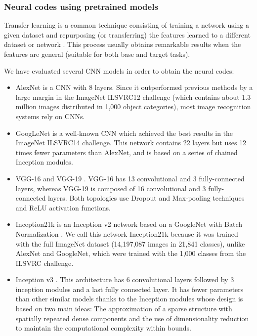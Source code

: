 \documentclass[final, twocolumn]{elsarticle}
\begin{document}
\subsubsection{Neural codes using pretrained models}
\label{sec:ncpm}

Transfer learning is a common technique consisting of training a network using a given dataset and repurposing (or transferring) the features learned to a different dataset or network \cite{Yosinski2014How}. This process usually obtains remarkable results when the features are general (suitable for both base and target tasks).

We have evaluated several CNN models in order to obtain the neural codes: 

\begin{itemize}
\item AlexNet \cite{Krizhevsky2012ImageNetNetworks} is a CNN with 8 layers. Since it outperformed previous methods by a large margin in the ImageNet ILSVRC12 \citep{Russakovsky2014ImageNetChallenge} challenge (which contains about 1.3 million images distributed in 1,000 object categories), most image recognition systems rely on CNNs. 

\item GoogLeNet \cite{Szegedy2014GoingConvolutions} is a well-known CNN which achieved the best results in the ImageNet ILSVRC14 challenge. This network contains 22 layers but uses 12 times fewer parameters than AlexNet, and is based on a series of chained Inception modules. 

\item VGG-16 and VGG-19 \cite{Simonyan14}. VGG-16 has 13 convolutional and 3 fully-connected layers, whereas VGG-19 is composed of 16 convolutional and 3 fully-connected layers. Both topologies use Dropout and Max-pooling techniques and ReLU activation functions. 

\item Inception21k is an Inception v2 network based on a GoogleNet with Batch Normalization \cite{Ioffe15:ArXiv}. We call this network Inception21k because it was trained with the full ImageNet dataset (14,197,087 images in 21,841 classes), unlike AlexNet and GoogleNet, which were trained with the 1,000 classes from the ILSVRC challenge. 

\item Inception v3 \cite{inceptionv3}. This architecture has 6 convolutional layers followed by 3 inception modules and a last fully connected layer. It has fewer parameters than other similar models thanks to the Inception modules whose design is based on two main ideas: The approximation of a sparse structure with spatially repeated dense components and the use of dimensionality reduction to maintain the computational complexity within bounds.


\end{itemize}
\end{document}
